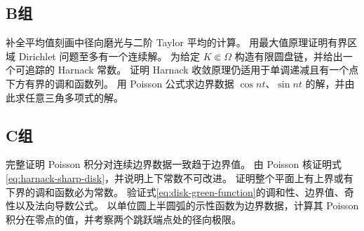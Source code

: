 \subsection*{B组}
\begin{enumerate}[label=\textbf{\thechapter.\arabic*.},resume]
补全平均值刻画中径向磨光与二阶 Taylor 平均的计算。
用最大值原理证明有界区域 Dirichlet 问题至多有一个连续解。
为给定 $K\Subset\Omega$ 构造有限圆盘链，并给出一个可追踪的 Harnack 常数。
证明 Harnack 收敛原理仍适用于单调递减且有一个点下方有界的调和函数列。
用 Poisson 公式求边界数据 $\cos nt$、$\sin nt$ 的解，并由此求任意三角多项式的解。
\end{enumerate}

\subsection*{C组}
\begin{enumerate}[label=\textbf{\thechapter.\arabic*.},resume]
完整证明 Poisson 积分对连续边界数据一致趋于边界值。
由 Poisson 核证明式\eqref{eq:harnack-sharp-disk}，并说明上下常数不可改进。
证明整个平面上有上界或有下界的调和函数必为常数。
验证式\eqref{eq:disk-green-function}的调和性、边界值、奇性以及法向导数公式。
以单位圆上半圆弧的示性函数为边界数据，计算其 Poisson 积分在零点的值，并考察两个跳跃端点处的径向极限。
\end{enumerate}
